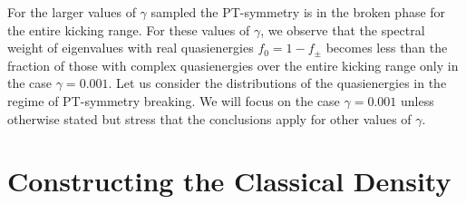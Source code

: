 \documentclass{iopart}
\begin{document}
For the larger values of $\gamma$ sampled the PT-symmetry is in the broken phase for the entire kicking range. For these values of $\gamma$, we observe that the spectral weight of eigenvalues with real quasienergies $f_0=1-f_{\pm}$ becomes less than the fraction of those with complex quasienergies over the entire kicking range only in the case $\gamma=0.001$.  Let us consider the distributions of the quasienergies in the regime of PT-symmetry breaking. We will focus on the case $\gamma=0.001$ unless otherwise stated but stress that the conclusions apply for other values of $\gamma$.

\section{Constructing the Classical Density}
\end{document}
